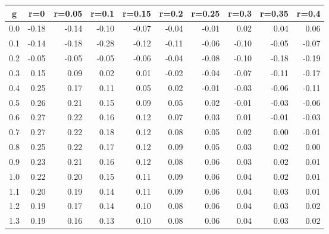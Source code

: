 %
\begin{table}[!tbp]
 \begin{center}
 \begin{tabular}{rrrrrrrrrr}\hline\hline
\multicolumn{1}{c}{g}&\multicolumn{1}{c}{r=0}&\multicolumn{1}{c}{r=0.05}&\multicolumn{1}{c}{r=0.1}&\multicolumn{1}{c}{r=0.15}&\multicolumn{1}{c}{r=0.2}&\multicolumn{1}{c}{r=0.25}&\multicolumn{1}{c}{r=0.3}&\multicolumn{1}{c}{r=0.35}&\multicolumn{1}{c}{r=0.4}\tabularnewline
\hline
0.0&-0.18&-0.14&-0.10&-0.07&-0.04&-0.01& 0.02& 0.04& 0.06\tabularnewline
0.1&-0.14&-0.18&-0.28&-0.12&-0.11&-0.06&-0.10&-0.05&-0.07\tabularnewline
0.2&-0.05&-0.05&-0.05&-0.06&-0.04&-0.08&-0.10&-0.18&-0.19\tabularnewline
0.3& 0.15& 0.09& 0.02& 0.01&-0.02&-0.04&-0.07&-0.11&-0.17\tabularnewline
0.4& 0.25& 0.17& 0.11& 0.05& 0.02&-0.01&-0.03&-0.06&-0.11\tabularnewline
0.5& 0.26& 0.21& 0.15& 0.09& 0.05& 0.02&-0.01&-0.03&-0.06\tabularnewline
0.6& 0.27& 0.22& 0.16& 0.12& 0.07& 0.03& 0.01&-0.01&-0.03\tabularnewline
0.7& 0.27& 0.22& 0.18& 0.12& 0.08& 0.05& 0.02& 0.00&-0.01\tabularnewline
0.8& 0.25& 0.22& 0.17& 0.12& 0.09& 0.05& 0.03& 0.02& 0.00\tabularnewline
0.9& 0.23& 0.21& 0.16& 0.12& 0.08& 0.06& 0.03& 0.02& 0.01\tabularnewline
1.0& 0.22& 0.20& 0.15& 0.11& 0.09& 0.06& 0.04& 0.02& 0.01\tabularnewline
1.1& 0.20& 0.19& 0.14& 0.11& 0.09& 0.06& 0.04& 0.03& 0.01\tabularnewline
1.2& 0.19& 0.17& 0.14& 0.10& 0.08& 0.06& 0.04& 0.03& 0.02\tabularnewline
1.3& 0.19& 0.16& 0.13& 0.10& 0.08& 0.06& 0.04& 0.03& 0.02\tabularnewline
\hline
\end{tabular}

\end{center}

\end{table}

